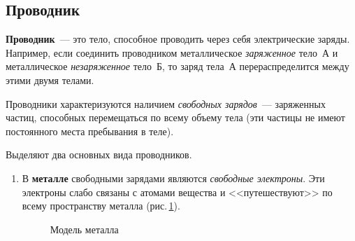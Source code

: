 \documentclass[main.tex]{subfiles}
\begin{document}

\pagestyle{empty}

\begin{NoHyper} %

\setcounter{section}{11
}
\addtocounter{section}{-1} 

\section{Проводник}


\textbf{Проводник}~--- это тело, способное проводить через себя электрические заряды. Например, если соединить проводником металлическое \emph{заряженное} тело~А и металлическое \emph{незаряженное} тело~Б, то заряд тела~А перераспределится между этими двумя телами.

Проводники характеризуются наличием \emph{свободных зарядов}~--- заряженных частиц, способных перемещаться по всему объему тела (эти частицы не имеют постоянного места пребывания в теле).

Выделяют два основных вида проводников.
\begin{enumerate}
    \item В \textbf{металле} свободными зарядами являются \emph{свободные электроны}. Эти электроны слабо связаны с атомами вещества и <<путешествуют>> по всему пространству металла (рис.\,\ref{fig:p107}).

    \begin{figure}[H]
    \centering

\caption{Модель металла}
\label{fig:p107}
\end{figure}
\nointerlineskip


\end{enumerate}
\end{NoHyper}
\end{document}
